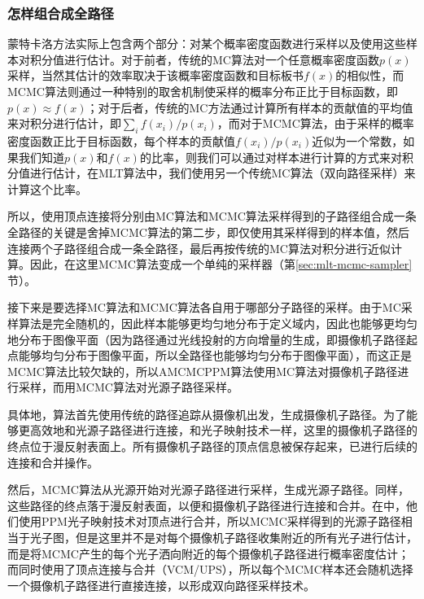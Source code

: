 \subsubsection{怎样组合成全路径}
蒙特卡洛方法实际上包含两个部分：对某个概率密度函数进行采样以及使用这些样本对积分值进行估计。对于前者，传统的MC算法对一个任意概率密度函数$p(x)$采样，当然其估计的效率取决于该概率密度函数和目标板书$f(x)$的相似性，而MCMC算法则通过一种特别的取舍机制使采样的概率分布正比于目标函数，即$p(x)\approx f(x)$；对于后者，传统的MC方法通过计算所有样本的贡献值的平均值来对积分进行估计，即$\sum_if(x_i)/p(x_i)$，而对于MCMC算法，由于采样的概率密度函数正比于目标函数，每个样本的贡献值$f(x_i)/p(x_i)$近似为一个常数，如果我们知道$p(x)$和$f(x)$的比率，则我们可以通过对样本进行计算的方式来对积分值进行估计，在MLT算法中，我们使用另一个传统MC算法（双向路径采样）来计算这个比率。

所以，使用顶点连接将分别由MC算法和MCMC算法采样得到的子路径组合成一条全路径的关键是舍掉MCMC算法的第二步，即仅使用其采样得到的样本值，然后连接两个子路径组合成一条全路径，最后再按传统的MC算法对积分进行近似计算。因此，在这里MCMC算法变成一个单纯的采样器（第\ref{sec:mlt-mcmc-sampler}节）。

接下来是要选择MC算法和MCMC算法各自用于哪部分子路径的采样。由于MC采样算法是完全随机的，因此样本能够更均匀地分布于定义域内，因此也能够更均匀地分布于图像平面（因为路径通过光线投射的方向增量的生成，即摄像机子路径起点能够均匀分布于图像平面，所以全路径也能够均匀分布于图像平面），而这正是MCMC算法比较欠缺的，所以AMCMCPPM算法使用MC算法对摄像机子路径进行采样，而用MCMC算法对光源子路径采样。

具体地，算法首先使用传统的路径追踪从摄像机出发，生成摄像机子路径。为了能够更高效地和光源子路径进行连接，和光子映射技术一样，这里的摄像机子路径的终点位于漫反射表面上。所有摄像机子路径的顶点信息被保存起来，已进行后续的连接和合并操作。

然后，MCMC算法从光源开始对光源子路径进行采样，生成光源子路径。同样，这些路径的终点落于漫反射表面，以便和摄像机子路径进行连接和合并。在\cite{a:RobustAdaptivePhotonTracingusingPhotonPathVisibility}中，他们使用PPM光子映射技术对顶点进行合并，所以MCMC采样得到的光源子路径相当于光子图，但是这里并不是对每个摄像机子路径收集附近的所有光子进行估计，而是将MCMC产生的每个光子洒向附近的每个摄像机子路径进行概率密度估计；而\cite{a:RobustLightTransportSimulationviaMetropolisedBidirectionalEstimators}同时使用了顶点连接与合并（VCM/UPS），所以每个MCMC样本还会随机选择一个摄像机子路径进行直接连接，以形成双向路径采样技术。





